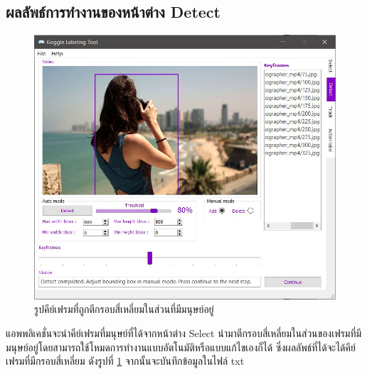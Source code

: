 \subsection*{ผลลัพธ์การทำงานของหน้าต่าง Detect}
\begin{figure}[!ht]
  \centering
    \includegraphics[scale=0.60]{chapter4/images/Result/result_select4.jpg}
    \caption{รูปคีย์เฟรมที่ถูกตีกรอบสี่เหลี่ยมในส่วนที่มีมนุษย์อยู่}
    \label{fig:result_detect}
\end{figure}
\clearpage
แอพพลิเคชั่นจะนำคีย์เฟรมที่มนุษย์ที่ได้จากหน้าต่าง Select นำมาตีกรอบสี่เหลี่ยมในส่วนของเฟรมที่มีมนุษย์อยู่โดยสามารถใช้โหมดการทำงานแบบอัตโนมัติหรือแบบแก้ไขเองก็ได้ 
ซึ่งผลลัพธ์ที่ได้จะได้คีย์เฟรมที่มีกรอบสี่เหลี่ยม ดังรูปที่ \ref{fig:result_detect} จากนั้นจะบันทึกข้อมูลในไฟล์ txt 


